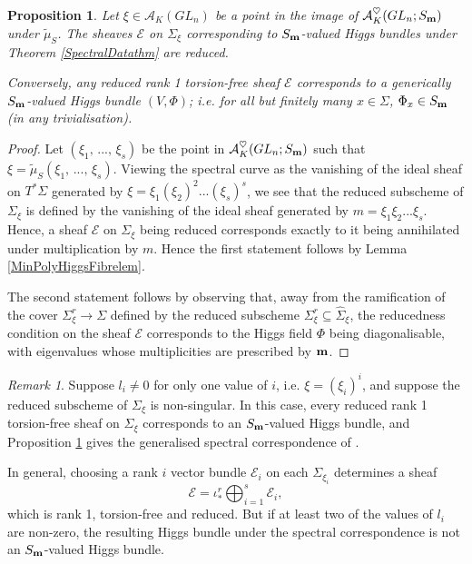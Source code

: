 \documentclass{amsart}
\newtheorem{proposition}[theorem]{Proposition}
\theoremstyle{remark}
\newtheorem{remark}[theorem]{Remark}
\numberwithin{theorem}{section}
\numberwithin{equation}{section}
\begin{document}
\begin{proposition}\label{GLnSmSpectralDataprp}
    Let $\xi \in \mathcal A_K(GL_n)$ be a point in the image of $\mathcal A^\heartsuit_K(GL_n;S_{\bf m})$ under $\tilde{\mu}_S$. The sheaves $\mathcal E$ on ${\Sigma}_\xi$ corresponding to $S_{\bf m}$-valued Higgs bundles under Theorem \ref{SpectralDatathm} are reduced. 

    Conversely, any reduced rank 1 torsion-free sheaf $\mathcal E$ corresponds to a \emph{generically} $S_{\bf m}$-valued Higgs bundle $(V,\Phi)$; i.e. for all but finitely many $x \in \Sigma$, $\Phi_x \in S_{\bf m}$ (in any trivialisation). 
\end{proposition}

\begin{proof} 
Let $(\xi_1, \, ..., \, \xi_s)$ be the point in $\mathcal A_K^\heartsuit(GL_n;S_{\bf m})$ such that $\xi = \tilde{\mu}_S(\xi_1, \, ..., \, \xi_s)$. Viewing the spectral curve as the vanishing of the ideal sheaf on $T^*\Sigma$ generated by $\xi = \xi_1(\xi_2)^2...(\xi_s)^s$, we see that the reduced subscheme of ${\Sigma}_\xi$ is defined by the vanishing of the ideal sheaf generated by $m = \xi_1\xi_2...\xi_s$. Hence, a sheaf $\mathcal E$ on ${\Sigma}_\xi$ being reduced corresponds exactly to it being annihilated under multiplication by $m$. Hence the first statement follows by Lemma \ref{MinPolyHiggsFibrelem}.

The second statement follows by observing that, away from the ramification of the cover ${\Sigma}^r_\xi \rightarrow \Sigma$ defined by the reduced subscheme ${\Sigma}^r_\xi \subseteq\hat{\Sigma}_\xi$, the reducedness condition on the sheaf $\mathcal E$ corresponds to the Higgs field $\Phi$ being diagonalisable, with eigenvalues whose multiplicities are prescribed by ${\bf m}$.
\end{proof}

\begin{remark}\label{GlnSmSpectralDatarmk}
   Suppose $l_i \neq 0$ for only one value of $i$, i.e. $\xi = (\xi_i)^i$, and suppose the reduced subscheme of ${\Sigma}_\xi$ is non-singular. In this case, every reduced rank 1 torsion-free sheaf on ${\Sigma}_\xi$ corresponds to an $S_{\bf m}$-valued Higgs bundle, and Proposition \ref{GLnSmSpectralDataprp} gives the generalised spectral correspondence of \cite[Theorem 6.7]{BR}.

    In general, choosing a rank $i$ vector bundle $\mathcal E_i$ on each ${\Sigma}_{\xi_i}$ determines a sheaf $$\mathcal E = \iota^r_*\bigoplus_{i=1}^s\mathcal E_i,$$ which is rank 1, torsion-free and reduced. But if at least two of the values of $l_i$ are non-zero, the resulting Higgs bundle under the spectral correspondence is not an $S_{\bf m}$-valued Higgs bundle.
\end{remark}
\end{document}
